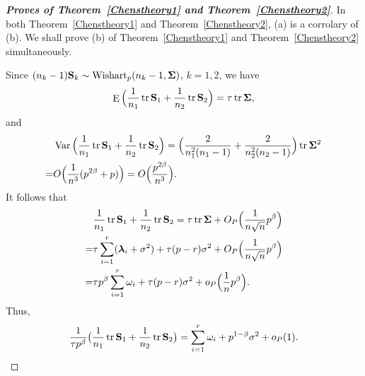 \documentclass[review]{elsarticle}
\DeclareMathOperator{\mytr}{tr}
\DeclareMathOperator{\myE}{E}
\DeclareMathOperator{\myVar}{Var}
\newcommand{\bfsym}[1]{\ensuremath{\boldsymbol{#1}}}
\def\blambda {\bfsym {\lambda}}        \def\bLambda {\bfsym {\Lambda}}
\theoremstyle{plain}
\theoremstyle{definition}
\theoremstyle{remark}
\begin{document}
\begin{proof}[\textbf{Proves of Theorem~\ref{Chenstheory1} and Theorem~\ref{Chenstheory2}}]
    In both Theorem~\ref{Chenstheory1} and Theorem~\ref{Chenstheory2}, (a) is a corrolary of (b).
    We shall prove (b) of Theorem~\ref{Chenstheory1} and Theorem~\ref{Chenstheory2} simultaneously.

    Since $(n_k-1)\BS_k\sim \text{Wishart}_p(n_k-1,\bSigma)$, $k=1,2$, we have %
%
    $$
 \myE\Big(\frac{1}{n_1}\mytr \BS_1+\frac{1}{n_2}\mytr \BS_2\Big)=\tau \mytr\bSigma,
    $$
    and
    $$
    \begin{aligned}
        &\myVar\Big(\frac{1}{n_1}\mytr \BS_1+\frac{1}{n_2}\mytr \BS_2\Big)=
        \Big(\frac{2}{n_1^2(n_1-1)}+\frac{2}{n_2^2(n_2-1)}\Big)\mytr \bSigma^2\\
        =&
    O\Big(\frac{1}{n^3}(p^{2\beta}+p)\Big)=O\Big(\frac{p^{2\beta}}{n^3}\Big).
    \end{aligned}
    $$
    It follows that
    $$
    \begin{aligned}
        &\frac{1}{n_1}\mytr \BS_1+\frac{1}{n_2}\mytr \BS_2=
    \tau \mytr \bSigma+O_P\Big(\frac{1}{n\sqrt{n}}p^{\beta}\Big)\\
        =&\tau \sum_{i=1}^r (\blambda_i+\sigma^2)+\tau(p-r)\sigma^2+O_P\Big(\frac{1}{n\sqrt{n}}p^{\beta}\Big)\\
        =&\tau p^{\beta} \sum_{i=1}^r \omega_i+\tau(p-r)\sigma^2+o_P\Big(\frac{1}{n}p^{\beta}\Big).
    \end{aligned}
    $$
Thus,
        \begin{equation}\label{eq:kkk1}
        \frac{1}{\tau p^\beta}\big(\frac{1}{n_1}\mytr \BS_1+\frac{1}{n_2}\mytr \BS_2\big)
        =\sum_{i=1}^r \omega_i+p^{1-\beta}\sigma^2+o_P(1).
        \end{equation}


\end{proof}
\end{document}
